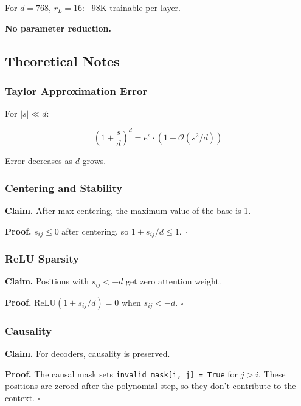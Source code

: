 For $d = 768$, $r_L = 16$: ~98K trainable per layer.

\textbf{No parameter reduction.}

\subsection{Theoretical Notes}

\subsubsection{Taylor Approximation Error}

For $|s| \ll d$:

\[
\left(1 + \frac{s}{d}\right)^d = e^s \cdot (1 + \mathcal{O}(s^2/d))
\tag{4.15}
\]

Error decreases as $d$ grows.

\subsubsection{Centering and Stability}

\textbf{Claim.} After max-centering, the maximum value of the base is 1.

\textbf{Proof.} $s_{ij} \leq 0$ after centering, so $1 + s_{ij}/d \leq 1$. $\square$

\subsubsection{ReLU Sparsity}

\textbf{Claim.} Positions with $s_{ij} < -d$ get zero attention weight.

\textbf{Proof.} ReLU$(1 + s_{ij}/d) = 0$ when $s_{ij} < -d$. $\square$

\subsubsection{Causality}

\textbf{Claim.} For decoders, causality is preserved.

\textbf{Proof.} The causal mask sets \texttt{invalid\_mask[i, j] = True} for $j > i$. 
These positions are zeroed after the polynomial step, so they don't 
contribute to the context. $\square$

